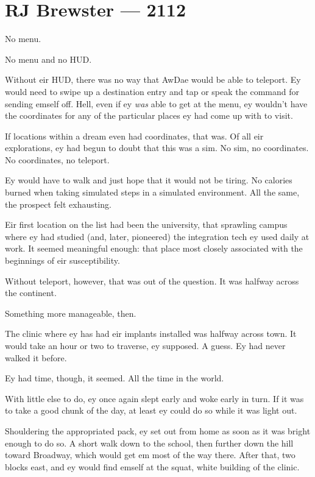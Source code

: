 \hypertarget{rj-brewster-2112}{%
\chapter*{RJ Brewster — 2112}\label{rj-brewster-2112}}

No menu.

No menu and no HUD.

Without eir HUD, there was no way that AwDae would be able to teleport. Ey would need to swipe up a destination entry and tap or speak the command for sending emself off. Hell, even if ey \emph{was} able to get at the menu, ey wouldn't have the coordinates for any of the particular places ey had come up with to visit.

If locations within a dream even had coordinates, that was. Of all eir explorations, ey had begun to doubt that this was a sim. No sim, no coordinates. No coordinates, no teleport.

Ey would have to walk and just hope that it would not be tiring. No calories burned when taking simulated steps in a simulated environment. All the same, the prospect felt exhausting.

Eir first location on the list had been the university, that sprawling campus where ey had studied (and, later, pioneered) the integration tech ey used daily at work. It seemed meaningful enough: that place most closely associated with the beginnings of eir susceptibility.

Without teleport, however, that was out of the question. It was halfway across the continent.

Something more manageable, then.

The clinic where ey has had eir implants installed was halfway across town. It would take an hour or two to traverse, ey supposed. A guess. Ey had never walked it before.

Ey had time, though, it seemed. All the time in the world.

With little else to do, ey once again slept early and woke early in turn. If it was to take a good chunk of the day, at least ey could do so while it was light out.

Shouldering the appropriated pack, ey set out from home as soon as it was bright enough to do so. A short walk down to the school, then further down the hill toward Broadway, which would get em most of the way there. After that, two blocks east, and ey would find emself at the squat, white building of the clinic.

